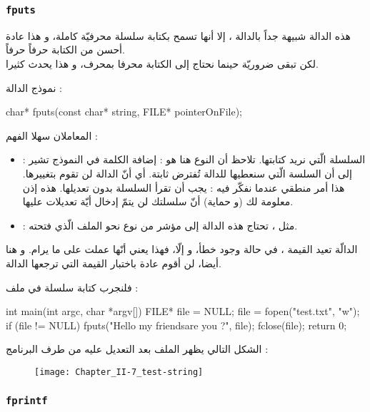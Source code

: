\subsubsection{\texttt{fputs}}

هذه الدالة شبيهة جداً بالدالة
،
إلا أنها تسمح بكتابة سلسلة محرفيّة كاملة، و هذا عادة أحسن من الكتابة حرفاً حرفاً.\\
لكن
تبقى ضروريّة حينما نحتاج إلى الكتابة محرفا بمحرف، و هذا يحدث كثيرا.

نموذج الدالة :

\begin{Csource}
char* fputs(const char* string, FILE* pointerOnFile);
\end{Csource}

المعاملان سهلا الفهم :
\begin{itemize}
  \item {} :
السلسلة الّتي نريد كتابتها. تلاحظ أن النوع هنا هو
 :
إضافة الكلمة
في النموذج تشير إلى أن السلسة الّتي سنعطيها للدالة تُفترض ثابتة. أي أنّ الدالة لن تقوم بتغييرها. هذا أمر منطقي عندما نفكّر فيه :
يجب أن تقرأ السلسلة بدون تعديلها. هذه إذن معلومة لك (و حماية) أنّ سلسلتك لن يتمّ إدخال أيّة تعديلات عليها.
  \item {} :
 مثل
،
 تحتاج هذه الدالة إلى مؤشر من نوع
نحو الملف الّذي فتحته.
\end{itemize}

الدالّة تعيد القيمة
،
في حالة وجود خطأ، و إلّا، فهذا يعني أنّها عملت على ما يرام. و هنا أيضا، لن أقوم عادة باختبار القيمة التي ترجعها الدالة.

فلنجرب كتابة سلسلة في ملف :

\begin{Csource}
int main(int argc, char *argv[])
{
	FILE* file = NULL;
	file = fopen("test.txt", "w");
	if (file != NULL)
	{
    	 	fputs("Hello my friends\nHow are you ?", file);
    	 	fclose(file);
	}
	return 0;
}
\end{Csource}

الشكل التالي يظهر الملف بعد التعديل عليه من طرف البرنامج :

\begin{figure}[H]
	\centering
	\texttt{[image: Chapter\_II-7\_test-string]}
\end{figure}

\subsubsection{\texttt{fprintf}}

